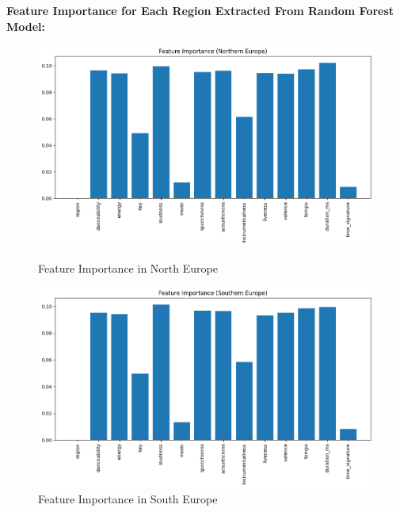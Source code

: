 \newpage
\textbf{Feature Importance for Each Region Extracted From Random Forest Model:}
\begin{figure}[h]
    \centering
    \begin{minipage}{0.45\textwidth}
        \centering
        \includegraphics[width=\linewidth]{media/rf_feature_imp_northen_europe.png}
        \caption{Feature Importance in North Europe}
    \end{minipage}%
    \hspace{0.05\textwidth} %
    \begin{minipage}{0.45\textwidth}
        \centering
        \includegraphics[width=\linewidth]{media/rf_feature_imp_southern_europe.png}
        \caption{Feature Importance in South Europe}
    \end{minipage}
\end{figure}
